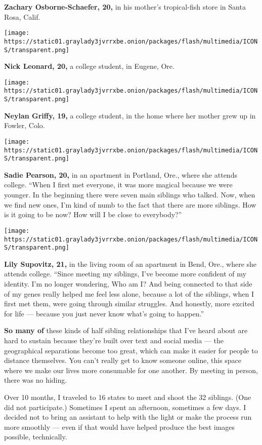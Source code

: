 \textbf{Zachary Osborne-Schaefer, 20,} in his mother's tropical-fish
store in Santa Rosa, Calif.

\texttt{[image: https://static01.graylady3jvrrxbe.onion/packages/flash/multimedia/ICONS/transparent.png]}

\textbf{Nick Leonard, 20,} a college student, in Eugene, Ore.

\texttt{[image: https://static01.graylady3jvrrxbe.onion/packages/flash/multimedia/ICONS/transparent.png]}

\textbf{Neylan Griffy, 19,} a college student, in the home where her
mother grew up in Fowler, Colo.

\texttt{[image: https://static01.graylady3jvrrxbe.onion/packages/flash/multimedia/ICONS/transparent.png]}

\textbf{Sadie Pearson, 20,} in an apartment in Portland, Ore., where she
attends college. ``When I first met everyone, it was more magical
because we were younger. In the beginning there were seven main siblings
who talked. Now, when we find new ones, I'm kind of numb to the fact
that there are more siblings. How is it going to be now? How will I be
close to everybody?''

\texttt{[image: https://static01.graylady3jvrrxbe.onion/packages/flash/multimedia/ICONS/transparent.png]}

\textbf{Lily Supovitz, 21,} in the living room of an apartment in Bend,
Ore., where she attends college. ``Since meeting my siblings, I've
become more confident of my identity. I'm no longer wondering, Who am I?
And being connected to that side of my genes really helped me feel less
alone, because a lot of the siblings, when I first met them, were going
through similar struggles. And honestly, more excited for life ---
because you just never know what's going to happen.''

\textbf{So many of} these kinds of half sibling relationships that I've
heard about are hard to sustain because they're built over text and
social media --- the geographical separations become too great, which
can make it easier for people to distance themselves. You can't really
get to know someone online, this space where we make our lives more
consumable for one another. By meeting in person, there was no hiding.

Over 10 months, I traveled to 16 states to meet and shoot the 32
siblings. (One did not participate.) Sometimes I spent an afternoon,
sometimes a few days. I decided not to bring an assistant to help with
the light or make the process run more smoothly --- even if that would
have helped produce the best images possible, technically.

